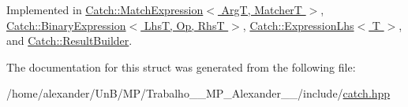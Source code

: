 Implemented in \hyperlink{classCatch_1_1MatchExpression_a4410a93bc5b8241eb2502f400fce7ec4}{Catch\-::\-Match\-Expression$<$ Arg\-T, Matcher\-T $>$}, \hyperlink{classCatch_1_1BinaryExpression_a6ed73ff9af9c229f9fa3d35d019f9e37}{Catch\-::\-Binary\-Expression$<$ Lhs\-T, Op, Rhs\-T $>$}, \hyperlink{classCatch_1_1ExpressionLhs_a7684a053e8e88a4be475a536252630da}{Catch\-::\-Expression\-Lhs$<$ T $>$}, and \hyperlink{classCatch_1_1ResultBuilder_a7d94b15cf04301a8617e7b16158b5d82}{Catch\-::\-Result\-Builder}.



The documentation for this struct was generated from the following file\-:\begin{DoxyCompactItemize}
\item 
/home/alexander/\-Un\-B/\-M\-P/\-Trabalho\-\_\-\_\-\-M\-P\-\_\-\-Alexander\-\_\-\_/include/\hyperlink{catch_8hpp}{catch.\-hpp}\end{DoxyCompactItemize}
